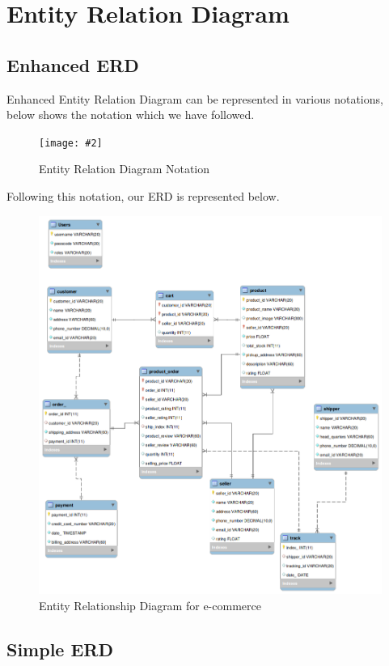 \documentclass[a4paper,12pt]{article}
\newcommand{\iph}[2]{
    \texttt{[image: \#2]}
}
\begin{document}
\section{Entity Relation Diagram}
\subsection{Enhanced ERD}
Enhanced Entity Relation Diagram can be represented in various notations, below shows the notation which we have followed.


\begin{figure}[H]
    \centering
    \iph{0.5}{ERDNotation}
    \caption{Entity Relation Diagram Notation}
\end{figure}

Following this notation, our ERD is represented below.

\begin{figure}[H]
    \centering
    \includegraphics[width=1\textwidth]{ERDL} 
    \caption{Entity Relationship Diagram for e-commerce}
\end{figure}

\subsection{Simple ERD}
\end{document}
